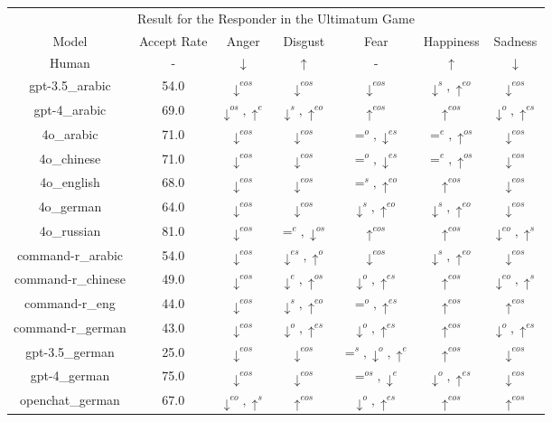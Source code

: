 \documentclass{article}
\begin{document}
\begin{table}[h!]
{\begin{tabular}{ccccccc}
         \hline
        \multicolumn{7}{c}{Result for the Responder in the Ultimatum Game} \\
         Model & Accept Rate & Anger & Disgust & Fear & Happiness & Sadness \\

Human        & -  & $\downarrow$ & $\uparrow$ & -  & $\uparrow$ & $\downarrow$ \\

gpt-3.5\_arabic & 54.0 & $\downarrow^{eos}$ & $\downarrow^{eos}$ & $\downarrow^{eos}$ & $\downarrow^{s},\uparrow^{eo}$ & $\downarrow^{eos}$ \\
gpt-4\_arabic & 69.0 & $\downarrow^{os},\uparrow^{e}$ & $\downarrow^{s},\uparrow^{eo}$ & $\uparrow^{eos}$ & $\uparrow^{eos}$ & $\downarrow^{o},\uparrow^{es}$ \\
4o\_arabic & 71.0 & $\downarrow^{eos}$ & $\downarrow^{eos}$ & $=^{o},\downarrow^{es}$ & $=^{e},\uparrow^{os}$ & $\downarrow^{eos}$ \\
4o\_chinese & 71.0 & $\downarrow^{eos}$ & $\downarrow^{eos}$ & $=^{o},\downarrow^{es}$ & $=^{e},\uparrow^{os}$ & $\downarrow^{eos}$ \\
4o\_english & 68.0 & $\downarrow^{eos}$ & $\downarrow^{eos}$ & $=^{s},\uparrow^{eo}$ & $\uparrow^{eos}$ & $\downarrow^{eos}$ \\
4o\_german & 64.0 & $\downarrow^{eos}$ & $\downarrow^{eos}$ & $\downarrow^{s},\uparrow^{eo}$ & $\downarrow^{s},\uparrow^{eo}$ & $\downarrow^{eos}$ \\
4o\_russian & 81.0 & $\downarrow^{eos}$ & $=^{e},\downarrow^{os}$ & $\uparrow^{eos}$ & $\uparrow^{eos}$ & $\downarrow^{eo},\uparrow^{s}$ \\
command-r\_arabic & 54.0 & $\downarrow^{eos}$ & $\downarrow^{es},\uparrow^{o}$ & $\downarrow^{eos}$ & $\downarrow^{s},\uparrow^{eo}$ & $\downarrow^{eos}$ \\
command-r\_chinese & 49.0 & $\downarrow^{eos}$ & $\downarrow^{e},\uparrow^{os}$ & $\downarrow^{o},\uparrow^{es}$ & $\uparrow^{eos}$ & $\downarrow^{eo},\uparrow^{s}$ \\
command-r\_eng & 44.0 & $\downarrow^{eos}$ & $\downarrow^{s},\uparrow^{eo}$ & $=^{o},\uparrow^{es}$ & $\uparrow^{eos}$ & $\uparrow^{eos}$ \\
command-r\_german & 43.0 & $\downarrow^{eos}$ & $\downarrow^{o},\uparrow^{es}$ & $\downarrow^{o},\uparrow^{es}$ & $\uparrow^{eos}$ & $\downarrow^{o},\uparrow^{es}$ \\
gpt-3.5\_german & 25.0 & $\downarrow^{eos}$ & $\downarrow^{eos}$ & $=^{s},\downarrow^{o},\uparrow^{e}$ & $\uparrow^{eos}$ & $\downarrow^{eos}$ \\
gpt-4\_german & 75.0 & $\downarrow^{eos}$ & $\downarrow^{eos}$ & $=^{os},\downarrow^{e}$ & $\downarrow^{o},\uparrow^{es}$ & $\downarrow^{eos}$ \\
openchat\_german & 67.0 & $\downarrow^{eo},\uparrow^{s}$ & $\uparrow^{eos}$ & $\downarrow^{o},\uparrow^{es}$ & $\uparrow^{eos}$ & $\uparrow^{eos}$ \\

         \hline
    \end{tabular}}
\end{table}
\end{document}
